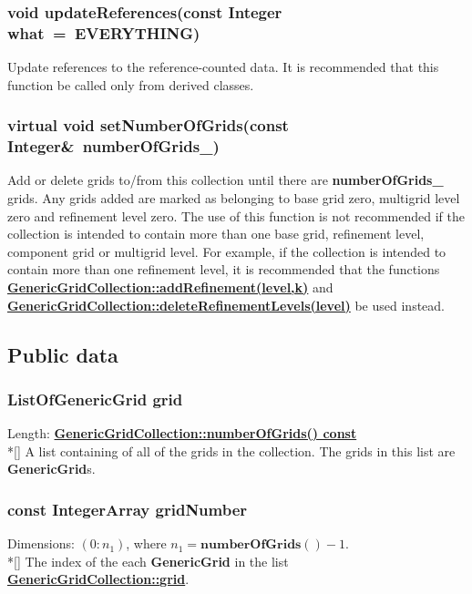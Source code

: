 \documentclass{article}
\begin{document}
  \subsubsection{void updateReferences(const Integer what~=~EVERYTHING)}
  \label{GenericGridCollection::updateReferences(what)}
    Update references to the reference-counted data.
    It is recommended that this function be called only from derived classes.

  \subsubsection{virtual void setNumberOfGrids(const Integer\&~numberOfGrids\_)}
  \label{GenericGridCollection::setNumberOfGrids(numberOfGrids_)}
    Add or delete grids to/from this collection until there are \textbf{numberOfGrids\_} grids.
    Any grids added are marked as belonging to base grid zero, multigrid level zero and refinement level zero.
    The use of this function is not recommended if the collection is intended to contain more than one
    base grid, refinement level, component grid or multigrid level.
    For example, if the collection is intended to contain more than one refinement level, it is recommended that the functions
    {\bf{}\hyperref{addRefinement(level,k)}{addRefinement(level,k) \rm(\S}{)}{GenericGridCollection::addRefinement(level,k)}} and
    {\bf{}\hyperref{deleteRefinementLevels(level)}{deleteRefinementLevels(level) \rm(\S}{)}{GenericGridCollection::deleteRefinementLevels(level)}}
    be used instead.

\subsection{Public data}
\label{GenericGridCollection::PublicData}

  \subsubsection{ListOfGenericGrid grid}
  \label{GenericGridCollection::grid}
    Length: {\bf{}\hyperref{numberOfGrids()}{numberOfGrids() \rm(\S}{)}{GenericGridCollection::numberOfGrids() const}} \\*[\parskip]
    A list containing of all of the grids in the collection. The grids in this list are \textbf{GenericGrid}s.

  \subsubsection{const IntegerArray gridNumber}
  \label{GenericGridCollection::gridNumber}
    Dimensions: $(0\colon n_1)$, where $n_1 = \textbf{numberOfGrids}() - 1$. \\*[\parskip]
    The index of the each \textbf{GenericGrid} in the list {\bf{}\hyperref{grid}{grid \rm(\S}{)}{GenericGridCollection::grid}}.
\end{document}
